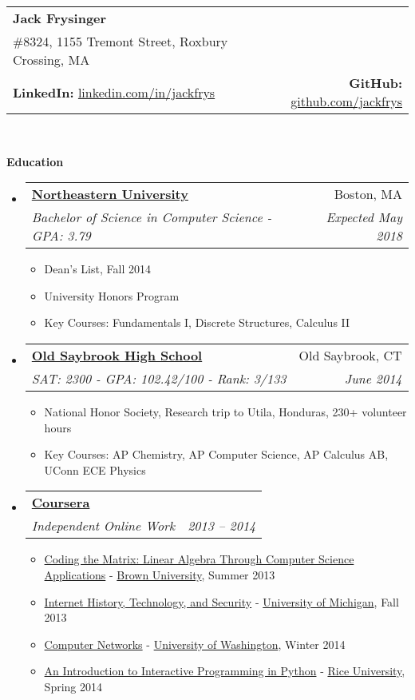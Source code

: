 \documentclass[letterpaper,10pt]{article}
\makeatletter
\newcommand{\resitem}[1]{\item #1 \vspace{-2pt}}
\newcommand{\resheading}[1]{{\large \colorbox{mygrey}{\begin{minipage}{\textwidth}{\textbf{#1 \vphantom{p\^{E}}}}\end{minipage}}}}
\newcommand{\ressubheading}[4]{
\begin{tabular*}{6.8in}{l@{\extracolsep{\fill}}r}
		\textbf{#1} & #2 \\
		\textit{#3} & \textit{#4} \\
\end{tabular*}\vspace{-6pt}}
\makeatother
\begin{document}
\newcommand{\mywebheader}{
\begin{tabular*}{7in}{l@{\extracolsep{\fill}}r}
	\textbf{\LARGE Jack Frysinger} & %
	\\
	\#8324, 1155 Tremont Street, Roxbury Crossing, MA & %
	\\
	\textbf{LinkedIn:} \href{http://linkedin.com/in/jackfrys}{linkedin.com/in/jackfrys} & \textbf{GitHub:} \href{https://github.com/jackfrys}{github.com/jackfrys} \\
	\end{tabular*}
\\
\vspace{0.1in}}

\mywebheader

\resheading{Education}
	\begin{itemize}[leftmargin=*]
		\item[]
			\ressubheading{\href{http://www.northeastern.edu}{Northeastern University}}{Boston, MA}{{Bachelor of Science in Computer Science - }{GPA: 3.79}}{Expected May 2018}
				{ \footnotesize
				\begin{itemize}
					\resitem{Dean's List, Fall 2014}
					\resitem{University Honors Program}
					\resitem{Key Courses: Fundamentals I, Discrete Structures, Calculus II}
				\end{itemize}}
		\item[]
			\ressubheading{\href{http://oldsaybrook.k12.ct.us/hs}{Old Saybrook High School}}{Old Saybrook, CT}{{SAT: 2300 - }{GPA: 102.42/100 - Rank: 3/133}}{June 2014}
			{\footnotesize
			\begin{itemize}
				\resitem{National Honor Society, Research trip to Utila, Honduras, 230+ volunteer hours}
				\resitem{Key Courses: AP Chemistry, AP Computer Science, AP Calculus AB, UConn ECE Physics}
			\end{itemize}}
		\item[]
			\ressubheading{\href{http://coursera.com}{Coursera}}{}{Independent Online Work}{2013 -- 2014}
				{\footnotesize
				\begin{itemize}
					\resitem{\href{https://coursera.org/course/matrix}{Coding the Matrix: Linear Algebra Through Computer Science Applications} - \href{http://brown.edu}{Brown University}, Summer 2013}
					\resitem{\href{https://coursera.org/course/insidetheinternet}{Internet History, Technology, and Security} - \href{http://umich.edu}{University of Michigan}, Fall 2013}
					\resitem{\href{https://coursera.org/course/comnetworks}{Computer Networks} - \href{http://uw.edu}{University of Washington}, Winter 2014}
					\resitem{\href{https://coursera.org/course/interactivepython}{An Introduction to Interactive Programming in Python} - \href{http://rice.edu}{Rice University}, Spring 2014}
				\end{itemize}}
	\end{itemize} %
\end{document}
